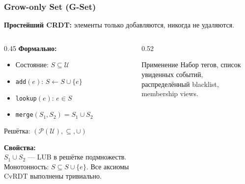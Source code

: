 \documentclass{beamer}
\begin{document}
\begin{frame}
\frametitle{Grow-only Set (G-Set)}

\textbf{Простейший CRDT:} элементы только добавляются, никогда не удаляются.

\begin{columns}
\begin{column}{0.45\textwidth}
\textbf{Формально:}
\begin{itemize}
  \item Состояние: $S \subseteq \mathcal{U}$
  \item \texttt{add}$(e)$: $S \leftarrow S \cup \{e\}$
  \item \texttt{lookup}$(e)$: $e \in S$
  \item \texttt{merge}$(S_1, S_2) = S_1 \cup S_2$
\end{itemize}

\medskip
Решётка: $(\mathcal{P}(\mathcal{U}), \subseteq, \cup)$

\medskip
\textbf{Свойства:}\\
$S_1 \cup S_2$ — LUB в решётке подмножеств. Монотонность: $S \subseteq S \cup \{e\}$. Все аксиомы CvRDT выполнены тривиально.
\end{column}
\begin{column}{0.52\textwidth}

\vspace{0.2em}
\begin{exampleblock}{Применение}
\small Набор тегов, список увиденных событий, распределённый blacklist, membership views.
\end{exampleblock}
\end{column}
\end{columns}

\end{frame}
\end{document}
